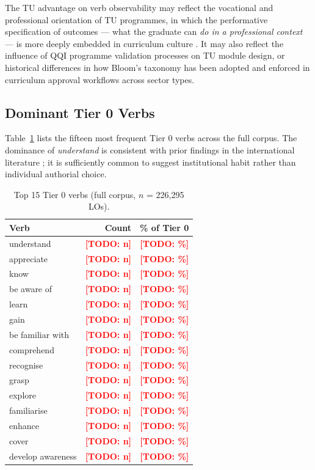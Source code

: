 \documentclass[12pt, a4paper]{article}
\newcommand{\todo}[1]{\textcolor{red}{\textbf{[TODO: #1]}}}
\begin{document}
The TU advantage on verb observability may reflect the vocational and professional
orientation of TU programmes, in which the performative specification of outcomes
--- what the graduate can \emph{do in a professional context} --- is more deeply
embedded in curriculum culture \citep{dait2022tu}. It may also reflect the
influence of QQI programme validation processes on TU module design, or historical
differences in how Bloom's taxonomy has been adopted and enforced in curriculum
approval workflows across sector types.

\subsection{Dominant Tier 0 Verbs}

Table~\ref{tab:tier0verbs} lists the fifteen most frequent Tier 0 verbs across
the full corpus. The dominance of \textit{understand} is consistent with prior
findings in the international literature \citep{kennedy2007writing}; it is
sufficiently common to suggest institutional habit rather than individual authorial
choice.

\begin{table}[H]
\centering
\caption{Top 15 Tier 0 verbs (full corpus, $n$ = 226,295 LOs).}
\label{tab:tier0verbs}
\begin{tabular}{lrr}
\toprule
\textbf{Verb} & \textbf{Count} & \textbf{\% of Tier 0} \\
\midrule
understand        & \todo{n} & \todo{\%} \\
appreciate        & \todo{n} & \todo{\%} \\
know              & \todo{n} & \todo{\%} \\
be aware of       & \todo{n} & \todo{\%} \\
learn             & \todo{n} & \todo{\%} \\
gain              & \todo{n} & \todo{\%} \\
be familiar with  & \todo{n} & \todo{\%} \\
comprehend        & \todo{n} & \todo{\%} \\
recognise         & \todo{n} & \todo{\%} \\
grasp             & \todo{n} & \todo{\%} \\
explore           & \todo{n} & \todo{\%} \\
familiarise       & \todo{n} & \todo{\%} \\
enhance           & \todo{n} & \todo{\%} \\
cover             & \todo{n} & \todo{\%} \\
develop awareness & \todo{n} & \todo{\%} \\
\bottomrule
\end{tabular}
\end{table}
\end{document}
